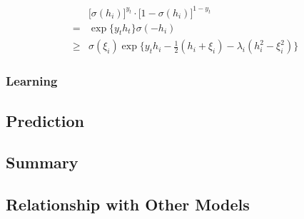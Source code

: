 \begin{align}
& \big[\sigma(h_{i})\big]^{y_t} \cdot  \big[1-\sigma(h_{i}) \big]^{1-y_t} \\
= & \exp\big\{ y_t h_t \big\} \sigma(-h_{i}) \\
\geq & \sigma(\xi_{i})\exp\big\{y_t h_{i}-\frac{1}{2}(h_{i}+\xi_{i})-\lambda_{i}(h_{i}^2-\xi_{i}^2)\big\}
\end{align}




\subsubsection{Learning}

\subsection{Prediction}

\subsection{Summary}



\subsection{Relationship with Other Models}